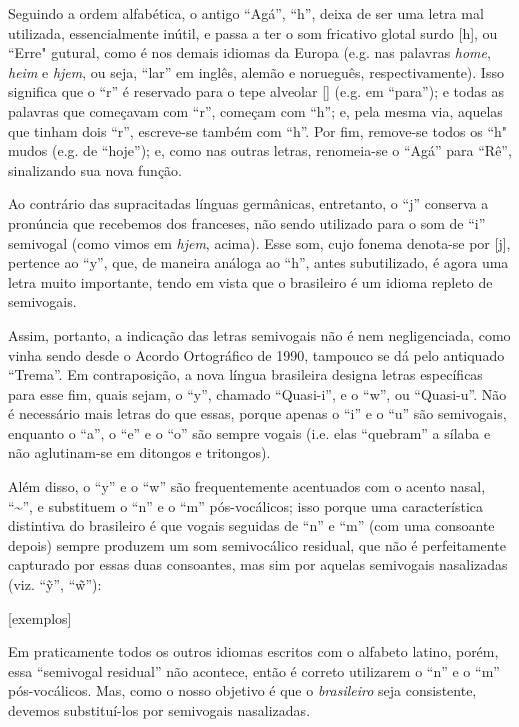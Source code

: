 \documentclass[12pt, a4paper]{article}
\begin{document}
\begin{bilingualpages}
    Seguindo a ordem alfabética, o antigo ``Agá'', ``h'', deixa de ser uma letra mal utilizada, essencialmente inútil, e passa a ter o som fricativo glotal surdo [h], ou ``Erre" gutural, como é nos demais idiomas da Europa (e.g. nas palavras \textit{home}, \textit{heim} e \textit{hjem}, ou seja, ``lar'' em inglês, alemão e norueguês, respectivamente). Isso significa que o ``r'' é reservado para o tepe alveolar [\textfishhookr] (e.g. em ``para''); e todas as palavras que começavam com ``r'', começam com ``h''; e, pela mesma via, aquelas que tinham dois ``r'', escreve-se também com ``h''. Por fim, remove-se todos os ``h" mudos (e.g. de ``hoje''); e, como nas outras letras, renomeia-se o ``Agá'' para ``Rê'', sinalizando sua nova função.

    Ao contrário das supracitadas línguas germânicas, entretanto, o ``j'' conserva a pronúncia que recebemos dos franceses, não sendo utilizado para o som de ``i'' semivogal (como vimos em \textit{hjem}, acima). Esse som, cujo fonema denota-se por [j], pertence ao ``y'', que, de maneira análoga ao ``h'', antes subutilizado, é agora uma letra muito importante, tendo em vista que o brasileiro é um idioma repleto de semivogais.
    
    Assim, portanto, a indicação das letras semivogais não é nem negligenciada, como vinha sendo desde o Acordo Ortográfico de 1990, tampouco se dá pelo antiquado ``Trema''. Em contraposição, a nova língua brasileira designa letras específicas para esse fim, quais sejam, o ``y'', chamado ``Quasi-i'', e o ``w'', ou ``Quasi-u''. Não é necessário mais letras do que essas, porque apenas o ``i'' e o ``u'' são semivogais, enquanto o ``a'', o ``e'' e o ``o'' são sempre vogais (i.e. elas ``quebram'' a sílaba e não aglutinam-se em ditongos e tritongos).
    
    Além disso, o ``y'' e o ``w'' são frequentemente acentuados com o acento nasal, ``\textasciitilde'', e substituem o ``n'' e o ``m'' pós-vocálicos; isso porque uma característica distintiva do brasileiro é que vogais seguidas de ``n'' e ``m'' (com uma consoante depois) sempre produzem um som semivocálico residual, que não é perfeitamente capturado por essas duas consoantes, mas sim por aquelas semivogais nasalizadas (viz. ``\~y'', ``\~w''):

    [exemplos]

    Em praticamente todos os outros idiomas escritos com o alfabeto latino, porém, essa ``semivogal residual'' não acontece, então é correto utilizarem o ``n'' e o ``m'' pós-vocálicos. Mas, como o nosso objetivo é que o \textit{brasileiro} seja consistente, devemos substituí-los por semivogais nasalizadas.


\end{bilingualpages}
\end{document}
